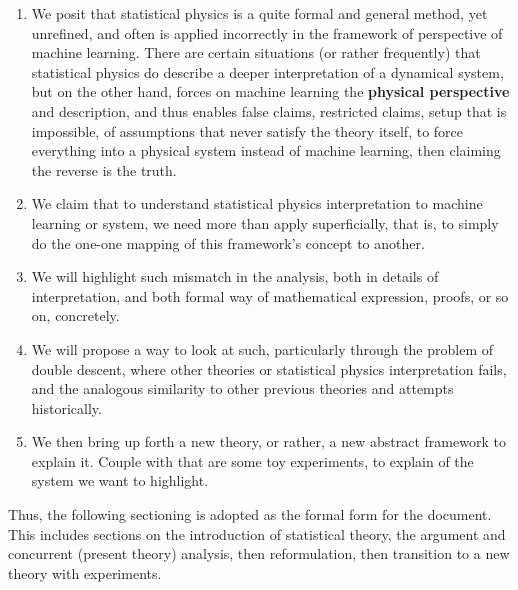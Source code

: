 \documentclass[
  journal=largetwo,
  year=2025,
  volume=37,
]{cup-journal}
\begin{document}
\begin{enumerate}
    \item We posit that statistical physics is a quite formal and general method, yet unrefined, and often is applied incorrectly in the framework of perspective of machine learning. There are certain situations (or rather frequently) that statistical physics do describe a deeper interpretation of a dynamical system, but on the other hand, forces on machine learning the \textbf{physical perspective} and description, and thus enables false claims, restricted claims, setup that is impossible, of assumptions that never satisfy the theory itself, to force everything into a physical system instead of machine learning, then claiming the reverse is the truth. 
    \item We claim that to understand statistical physics interpretation to machine learning or system, we need more than apply superficially, that is, to simply do the one-one mapping of this framework's concept to another. 
    \item We will highlight such mismatch in the analysis, both in details of interpretation, and both formal way of mathematical expression, proofs, or so on, concretely. 
    \item We will propose a way to look at such, particularly through the problem of double descent, where other theories or statistical physics interpretation fails, and the analogous similarity to other previous theories and attempts historically. 
    \item We then bring up forth a new theory, or rather, a new abstract framework to explain it. Couple with that are some toy experiments, to explain of the system we want to highlight. 
\end{enumerate}

Thus, the following sectioning is adopted as the formal form for the document. This includes sections on the introduction of statistical theory, the argument and concurrent (present theory) analysis, then reformulation, then transition to a new theory with experiments. 
\end{document}
